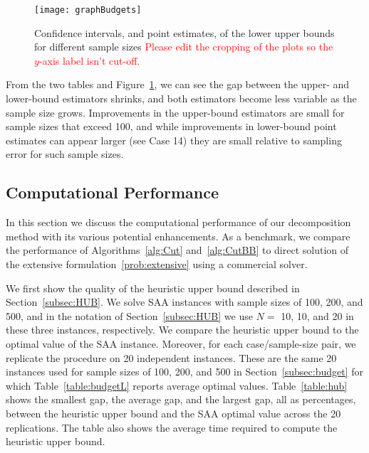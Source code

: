 \documentclass[11pt]{article}
\newcommand{\tcr}{\textcolor{red}}
\begin{document}
	\begin{figure}[H]
		\centering
		\texttt{[image: graphBudgets]}
		\caption{Confidence intervals, and point estimates, of the lower upper bounds for different sample sizes \tcr{Please edit the cropping of the plots so the $y$-axis label isn't cut-off.}}
		\label{fig:budget}
	\end{figure}
	
	From the two tables and Figure~\ref{fig:budget}, we can see the gap between the upper- and lower-bound estimators shrinks, and both estimators become less variable as the sample size grows. Improvements in the upper-bound estimators are small for sample sizes that exceed 100, and while improvements in lower-bound point estimates can appear larger (see Case 14) they are small relative to sampling error for such sample sizes.  
	
	\subsection{Computational Performance} \label{subsec:time}
	In this section we discuss the computational performance of our decomposition method with its various potential enhancements. As a benchmark, we compare the performance of Algorithms~\ref{alg:Cut} and~\ref{alg:CutBB} to direct solution of the extensive formulation~\eqref{prob:extensive} using a commercial solver. 
	
	We first show the quality of the heuristic upper bound described in Section~\ref{subsec:HUB}. We solve SAA instances with sample sizes of 100, 200, and 500, and in the notation of Section~\ref{subsec:HUB} we use $N= $ 10, 10, and 20 in these three instances, respectively. We compare the heuristic upper bound to the optimal value of the SAA instance. Moreover, for each case/sample-size pair, we replicate the procedure on 20 independent instances. These are the same 20 instances used for sample sizes of 100, 200, and 500 in Section~\ref{subsec:budget} for which Table~\ref{table:budgetL} reports average optimal values. Table~\ref{table:hub} shows the smallest gap, the average gap, and the largest gap, all as percentages, between the heuristic upper bound and the SAA optimal value across the 20 replications. The table also shows the average time required to compute the heuristic upper bound.
	
\end{document}
